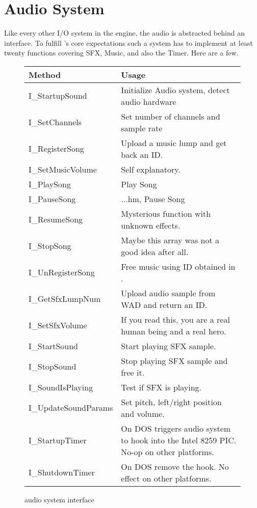 \section{Audio System}
\label{dmx_section}
Like every other I/O system in the engine, the audio is abstracted behind an interface. To fulfill \doom's core expectations such a system has to implement at least twenty functions covering SFX, Music, and also the Timer. Here are a few.\\
\par
 \begin{figure}[H]
\centering  
\begin{tabularx}{\textwidth}{ L{0.57}  L{1.43}}
  \toprule
  \textbf{Method} &  \textbf{Usage}\\

  \toprule 
  I\_StartupSound & Initialize Audio system, detect audio hardware\\
  I\_SetChannels & Set number of channels and sample rate\\
  \toprule 
   
I\_RegisterSong & Upload a music lump and get back an ID.\\
I\_SetMusicVolume & Self explanatory.\\
I\_PlaySong & Play Song\\
I\_PauseSong & ...hm, Pause Song\\
I\_ResumeSong & Mysterious function with unknown effects.\\
I\_StopSong & Maybe this array was not a good idea after all.\\
I\_UnRegisterSong & Free music using ID obtained in .\\




  \toprule 
I\_GetSfxLumpNum & Upload audio sample from WAD and return an ID.\\
I\_SetSfxVolume & If you read this, you are a real human being and a real hero.\\
I\_StartSound & Start playing SFX sample.\\
I\_StopSound & Stop playing SFX sample and free it.\\
I\_SoundIsPlaying & Test if SFX is playing.\\
I\_UpdateSoundParams & Set pitch, left/right position and volume.\\

  \toprule 
  
I\_StartupTimer & On DOS triggers audio system to hook into the Intel 8259 PIC. No-op on other platforms.\\
I\_ShutdownTimer & On DOS remove the hook.  No effect on other platforms.\\

   \toprule
\end{tabularx}
\caption{\doom{} audio system interface}
\end{figure}




